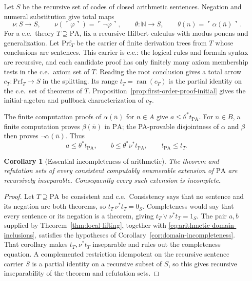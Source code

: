 \documentclass[11pt]{article}
\newtheorem{corollary}[theorem]{Corollary}
\newcommand{\N}{\mathbb N}
\newcommand{\PA}{\mathrm{PA}}
\newcommand{\ran}{\operatorname{ran}}
\begin{document}
Let $S$ be the recursive set of codes of closed arithmetic sentences.
Negation and numeral substitution give total maps
\[
 \nu:S\to S,\qquad \nu(\ulcorner\varphi\urcorner)
     =\ulcorner\neg\varphi\urcorner,
 \qquad
 \theta:\N\to S,\qquad \theta(n)=\ulcorner\alpha(\bar n)\urcorner.
\]
For a c.e.\ theory $T\supseteq\PA$, fix a recursive Hilbert calculus
with modus ponens and generalization. Let $\mathrm{Prf}_T$ be the
carrier of finite derivation trees from $T$ whose conclusions are sentences.
This carrier is c.e.: the logical rules and formula syntax are
recursive, and each candidate proof has only finitely many axiom
membership tests in the c.e.\ axiom set of $T$. Reading the root
conclusion gives a total arrow
$c_T:\mathrm{Prf}_T\to S$ in the splitting. Its range
$t_T=\ran(c_T)$ is the partial identity on the c.e.\ set of theorems
of $T$.
Proposition~\ref{prop:first-order-proof-initial} gives the initial-algebra
and pullback characterization of $c_T$.

The finite computation proofs of $\alpha(\bar n)$ for $n\in A$ give
$a\le\theta^*t_{\PA}$. For $n\in B$, a finite computation proves
$\beta(\bar n)$ in $\PA$; the PA-provable disjointness of $\alpha$
and $\beta$ then proves $\neg\alpha(\bar n)$. Thus
\begin{equation}\label{eq:arithmetic-domain-inclusions}
 a\le\theta^*t_{\PA},\qquad
 b\le\theta^*\nu^*t_{\PA},\qquad
 t_{\PA}\le t_T.
\end{equation}

\begin{corollary}[Essential incompleteness of arithmetic]\label{cor:arithmetic}
The theorem and refutation sets of every consistent computably
enumerable extension of $\PA$ are recursively inseparable.
Consequently every such extension is incomplete.
\end{corollary}
\begin{proof}
Let $T\supseteq\PA$ be consistent and c.e.\ Consistency says that
no sentence and its negation are both theorems, so
$t_T\,\nu^*t_T=0_S$. Completeness would say that every sentence or
its negation is a theorem, giving $t_T\vee\nu^*t_T=1_S$.
The pair $a,b$ supplied by Theorem~\ref{thm:local-lifting}, together
with \eqref{eq:arithmetic-domain-inclusions}, satisfies the hypotheses
of Corollary~\ref{cor:domain-incompleteness}. That corollary makes
$t_T,\nu^*t_T$ inseparable and rules out the completeness equation.
A complemented restriction idempotent on the recursive sentence carrier
$S$ is a partial identity on a recursive subset of $S$, so this gives
recursive inseparability of the theorem and refutation sets.
\end{proof}
\end{document}
